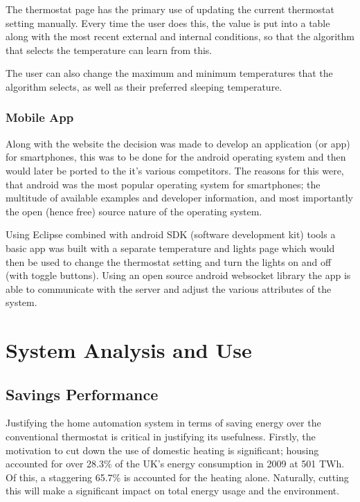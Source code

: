 \documentclass[10.5pt,a4paper,twoside]{report}   %
\begin{document}
The thermostat page has the primary use of updating the current thermostat setting manually. Every time the user does this, the value is put into a table along with the most recent external and internal conditions, so that the algorithm that selects the temperature can learn from this.

The user can also change the maximum and minimum temperatures that the algorithm selects, as well as their preferred sleeping temperature.
\subsection{Mobile App}

Along with the website the decision was made to develop an application (or app) for smartphones, this was to be done for the android operating system and then would later be ported to the it’s various competitors. The reasons for this were, that android was the most popular operating system for smartphones; the multitude of available examples and developer information, and most importantly the open (hence free) source nature of the operating system.

Using Eclipse combined with android SDK (software development kit) tools a basic app was built with a separate temperature and lights page which would then be used to change the thermostat setting and turn the lights on and off (with toggle buttons). Using an open source android websocket library the app is able to communicate with the server and adjust the various attributes of the system.
\chapter{System Analysis and Use}
\section{Savings Performance}
Justifying the home automation system in terms of saving energy over the conventional thermostat is critical in justifying its usefulness. Firstly, the motivation to cut down the use of domestic heating is significant; housing accounted for over 28.3\% of the UK’s energy consumption in 2009\cite{GBFactFile} at 501 TWh. Of this, a staggering 65.7\% is accounted for the heating alone. Naturally, cutting this will make a significant impact on total energy usage and the environment.
\end{document}
